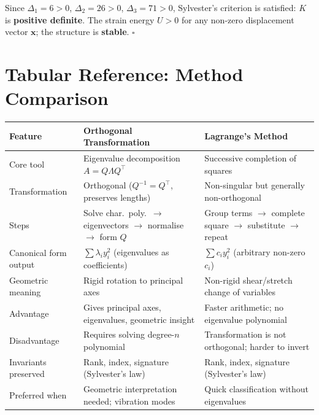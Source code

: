 \documentclass[12pt,a4paper]{article}
\begin{document}
Since $\Delta_1 = 6 > 0$, $\Delta_2 = 26 > 0$, $\Delta_3 = 71 > 0$, Sylvester's criterion is satisfied: $K$ is \textbf{positive definite}. The strain energy $U > 0$ for any non-zero displacement vector $\mathbf{x}$; the structure is \textbf{stable}. \hfill$\square$

\section{Tabular Reference: Method Comparison}

\begin{center}
\begin{tabular}{@{}p{3cm}p{4.5cm}p{4.5cm}@{}}
\toprule
\textbf{Feature} & \textbf{Orthogonal Transformation} & \textbf{Lagrange's Method} \\
\midrule
Core tool & Eigenvalue decomposition $A = Q\Lambda Q^{\top}$ & Successive completion of squares \\
\addlinespace
Transformation & Orthogonal ($Q^{-1}=Q^{\top}$, preserves lengths) & Non-singular but generally non-orthogonal \\
\addlinespace
Steps & Solve char.\ poly.\ $\to$ eigenvectors $\to$ normalise $\to$ form $Q$ & Group terms $\to$ complete square $\to$ substitute $\to$ repeat \\
\addlinespace
Canonical form output & $\sum \lambda_i y_i^{2}$ (eigenvalues as coefficients) & $\sum c_i y_i^{2}$ (arbitrary non-zero $c_i$) \\
\addlinespace
Geometric meaning & Rigid rotation to principal axes & Non-rigid shear/stretch change of variables \\
\addlinespace
Advantage & Gives principal axes, eigenvalues, geometric insight & Faster arithmetic; no eigenvalue polynomial \\
\addlinespace
Disadvantage & Requires solving degree-$n$ polynomial & Transformation is not orthogonal; harder to invert \\
\addlinespace
Invariants preserved & Rank, index, signature (Sylvester's law) & Rank, index, signature (Sylvester's law) \\
\addlinespace
Preferred when & Geometric interpretation needed; vibration modes & Quick classification without eigenvalues \\
\bottomrule
\end{tabular}
\end{center}
\end{document}
